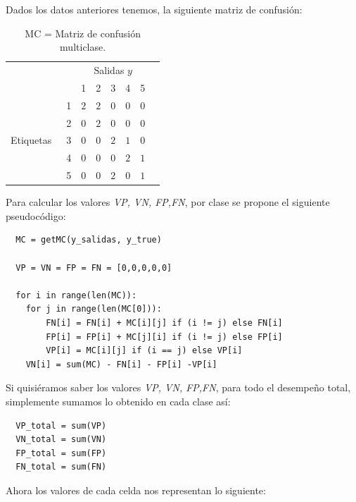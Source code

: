 \begin{description}
\begin{example}
Dados los datos anteriores tenemos, la siguiente matriz de confusión: 
 \begin{table}[H]
\begin{center}
\begin{tabular}{|c|c|c|c|c|c|c|c|}
\cline{3-8}
\multicolumn{2}{c|}{} & \multicolumn{5}{c|}{Salidas $y$} \\
\cline{3-8}
\multicolumn{2}{c|}{} & 1 & 2 & 3 & 4 & 5 \\
\hline
\multirow{5}{*}{\begin{sideways} Etiquetas~ \end{sideways}} & 1 & $2$ & $2$ & $0$ & $0$ & $0$ \\
\cline{2-8}
& 2 & $0$ & $2$  & $0$ & $0$ & $0$ \\
\cline{2-8}
& 3 & $0$ & $0$  & $2$ & $1$ & $0$ \\
\cline{2-8}
& 4 & $0$ & $0$  & $0$ & $2$ & $1$ \\
\cline{2-8}
& 5 & $0$ & $0$  & $2$ & $0$ & $1$ \\
\hline
\end{tabular}
\end{center}
\caption{MC = Matriz de confusión multiclase.}
\label{Table2}
\end{table}

\label{ej:muticlase}
\end{example}
 

 Para calcular los valores \emph{VP, VN, FP,FN}, por clase se propone el siguiente pseudocódigo:
 \begin{verbatim}
  MC = getMC(y_salidas, y_true)
  
  VP = VN = FP = FN = [0,0,0,0,0]

  for i in range(len(MC)):
    for j in range(len(MC[0])):
        FN[i] = FN[i] + MC[i][j] if (i != j) else FN[i]
        FP[i] = FP[i] + MC[j][i] if (i != j) else FP[i]
        VP[i] = MC[i][j] if (i == j) else VP[i]
    VN[i] = sum(MC) - FN[i] - FP[i] -VP[i]
 \end{verbatim}

 Si quisiéramos saber los valores \emph{VP, VN, FP,FN}, para todo el desempeño total, simplemente sumamos lo obtenido en cada clase así:

 \begin{verbatim}
  VP_total = sum(VP)
  VN_total = sum(VN)
  FP_total = sum(FP)
  FN_total = sum(FN)
 \end{verbatim}

    Ahora los valores de cada celda nos representan lo siguiente:
 

\end{description}
